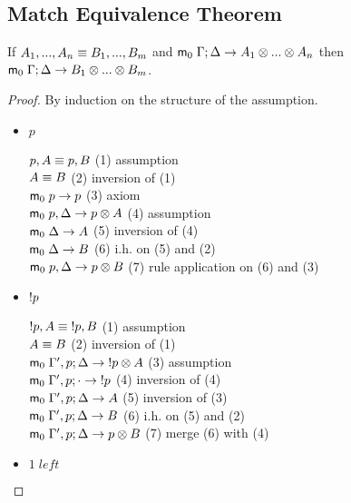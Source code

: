 \subsection{Match Equivalence Theorem}

If $A_1, ..., A_n \equiv B_1, ..., B_m$ and $\mathsf{m}_0 \; \Gamma ; \Delta \rightarrow A_1 \otimes ... \otimes A_n$ then $\mathsf{m}_0 \; \Gamma; \Delta \rightarrow B_1 \otimes ... \otimes B_m$.

\begin{proof}
   By induction on the structure of the assumption.
   
   \begin{itemize}
      \item $p$
      
      $p, A \equiv p, B$ \hfill (1) assumption \\
      $A \equiv B$ \hfill (2) inversion of (1) \\
      $\mathsf{m}_0 \; p \rightarrow p$ \hfill (3) axiom \\
      $\mathsf{m}_0 \; p, \Delta \rightarrow p \otimes A$ \hfill (4) assumption \\
      $\mathsf{m}_0 \; \Delta \rightarrow A$ \hfill (5) inversion of (4) \\
      $\mathsf{m}_0 \; \Delta \rightarrow B$ \hfill (6) i.h. on (5) and (2) \\
      $\mathsf{m}_0 \; p, \Delta \rightarrow p \otimes B$ \hfill (7) rule application on (6) and (3) \\
      
      \item ${!} p$
      
      ${!} p, A \equiv {!} p, B$ \hfill (1) assumption \\
      $A \equiv B$ \hfill (2) inversion of (1) \\
      $\mathsf{m}_0 \; \Gamma', p; \Delta \rightarrow {!} p \otimes A$ \hfill (3) assumption \\
      $\mathsf{m}_0 \; \Gamma', p; \cdot \rightarrow {!} p$ \hfill (4) inversion of (4) \\
      $\mathsf{m}_0 \; \Gamma', p; \Delta \rightarrow A$ \hfill (5) inversion of (3) \\
      $\mathsf{m}_0 \; \Gamma', p; \Delta \rightarrow B$ \hfill (6) i.h. on (5) and (2) \\
      $\mathsf{m}_0 \; \Gamma', p; \Delta \rightarrow p \otimes B$ \hfill (7) merge (6) with (4) \\
      
      \item $1 \; left$
      

\end{itemize}
\end{proof}
